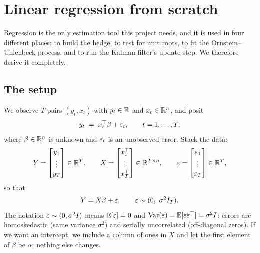 \section{Linear regression from scratch}
\label{ch:ols}

Regression is the only estimation tool this project needs, and it is used in four
different places: to build the hedge, to test for unit roots, to fit the
Ornstein--Uhlenbeck process, and to run the Kalman filter's update step. We therefore
derive it completely.

\subsection{The setup}
\label{sec:ols:setup}

We observe $T$ pairs $(y_t, x_t)$ with $y_t\in\mathbb{R}$ and $x_t\in\mathbb{R}^{n}$, and posit
\begin{equation}
  y_t \;=\; x_t^{\top}\beta + \varepsilon_t,\qquad t=1,\dots,T,
  \label{eq:ols:model}
\end{equation}
where $\beta\in\mathbb{R}^n$ is unknown and $\varepsilon_t$ is an unobserved error. Stack the data:
\begin{equation}
  Y=\begin{bmatrix}y_1\\ \vdots\\ y_T\end{bmatrix}\in\mathbb{R}^{T},\qquad
  X=\begin{bmatrix}x_1^{\top}\\ \vdots\\ x_T^{\top}\end{bmatrix}\in\mathbb{R}^{T\times n},
  \qquad
  \varepsilon=\begin{bmatrix}\varepsilon_1\\ \vdots\\ \varepsilon_T\end{bmatrix}\in\mathbb{R}^{T},
\end{equation}
so that
\begin{equation}
  Y = X\beta + \eps,\qquad \eps\sim(0,\ \sigma^{2}I_T).
  \label{eq:linmodel}
\end{equation}
The notation $\varepsilon\sim(0,\sigma^2 I)$ means $\mathbb{E}[\varepsilon]=0$ and
$\operatorname{Var}(\varepsilon)=\mathbb{E}[\varepsilon\varepsilon^{\top}]=\sigma^2 I$: errors are homoskedastic
(same variance $\sigma^2$) and serially uncorrelated (off-diagonal zeros). If we want an
intercept, we include a column of ones in $X$ and let the first element of $\beta$ be
$\alpha$; nothing else changes.

